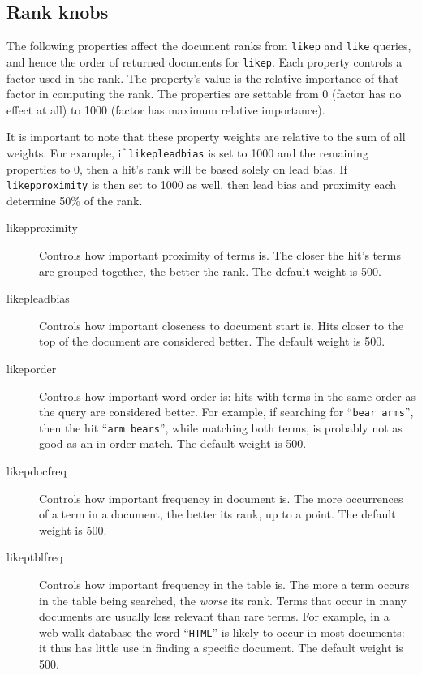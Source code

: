 \subsection{Rank knobs}
\label{rankknobs}

  The following properties affect the document ranks from \verb`likep`
and \verb`like` queries, and hence the order of returned documents for
\verb`likep`.  Each property controls a factor used in the rank.  The
property's value is the relative importance of that factor in
computing the rank.  The properties are settable from 0 (factor has no
effect at all) to 1000 (factor has maximum relative importance).

  It is important to note that these property weights are relative to
the sum of all weights.  For example, if \verb`likepleadbias` is
set to 1000 and the remaining properties to 0, then a hit's rank will
be based solely on lead bias.  If \verb`likepproximity` is then set to
1000 as well, then lead bias and proximity each determine 50\% of the
rank.

\begin{description}
\item[likepproximity]
  Controls how important proximity of terms is.  The closer the hit's
terms are grouped together, the better the rank.  The default weight
is 500.

\item[likepleadbias]
  Controls how important closeness to document start is.  Hits closer
to the top of the document are considered better.  The default weight
is 500.

\item[likeporder]
  Controls how important word order is: hits with terms in the same
order as the query are considered better.  For example, if searching
for ``{\tt bear arms}'', then the hit ``{\tt arm bears}'', while
matching both terms, is probably not as good as an in-order match.
The default weight is 500.

\item[likepdocfreq]
  Controls how important frequency in document is.  The more
occurrences of a term in a document, the better its rank, up to a point.
The default weight is 500.

\item[likeptblfreq]
  Controls how important frequency in the table is.  The more a term
occurs in the table being searched, the {\em worse} its rank.  Terms
that occur in many documents are usually less relevant than rare
terms.  For example, in a web-walk database the word ``\verb`HTML`''
is likely to occur in most documents: it thus has little use in
finding a specific document.  The default weight is 500.

\end{description}

